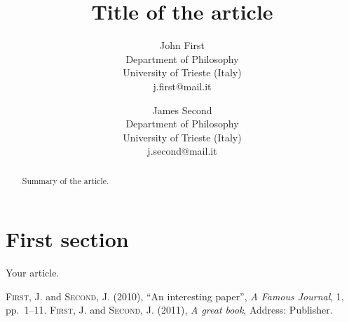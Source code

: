 \documentclass{lps}
\begin{document}
\title{Title of the article}
\author{John First\\Department of Philosophy\\University of Trieste (Italy)\\j.first@mail.it \and%
            James Second\\Department of Philosophy\\University of Trieste (Italy)\\j.second@mail.it}
\maketitle
\tableofcontents
\begin{abstract}
Summary of the article.
\end{abstract}
\section{First section}
Your article.\par
\begin{thebibliography}{AAA}
 \textsc{First, J.} and \textsc{Second, J.} (2010), ``An interesting paper'', \emph{A Famous Journal}, 1, pp.~1--11.
 \textsc{First, J.} and \textsc{Second, J.} (2011), \emph{A great book}, Address: Publisher.
\end{thebibliography}
\end{document}
